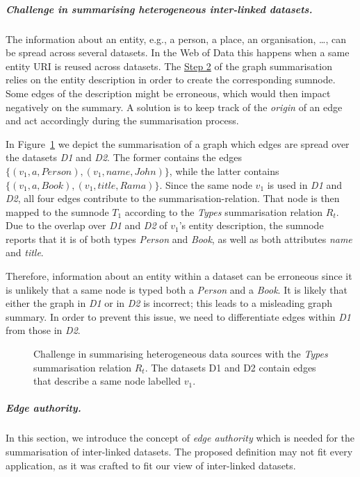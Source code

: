 \subparagraph{Challenge in summarising heterogeneous inter-linked datasets.}

The information about an entity, e.g., a person, a place, an organisation, \ldots, can be spread across several datasets. In the Web of Data this happens when a same entity URI is reused across datasets. The \hyperref[step-hn]{Step 2} of the graph summarisation relies on the entity description  in order to create the corresponding sumnode. Some edges of the description might be erroneous, which would then impact negatively on the summary. A solution is to keep track of the \emph{origin} of an edge and act accordingly during the summarisation process.

In Figure~\ref{chap4:summary:fig:sum-issue} we depict the summarisation of a graph which edges are spread over the datasets \emph{D1} and \emph{D2}. The former contains the edges $\{ (v_1, a, Person), (v_1, name, John) \}$, while the latter contains $\{ (v_1, a, Book), (v_1, title, Rama) \}$. Since the same node $v_1$ is used in \emph{D1} and \emph{D2}, all four edges contribute to the \gls{summarisation-relation}. That node is then mapped to the sumnode $T_1$ according to the \emph{Types} summarisation relation $R_t$.
Due to the overlap over \emph{D1} and \emph{D2} of $v_1$'s entity description, the sumnode reports that it is of both types \emph{Person} and \emph{Book}, as well as both \gls{attributes} \emph{name} and \emph{title}.

Therefore, information about an entity within a dataset can be erroneous since it is unlikely that a same node is typed both a \emph{Person} and a \emph{Book}. It is likely that either the graph in \emph{D1} or in \emph{D2} is incorrect; this leads to a misleading graph summary.
In order to prevent this issue, we need to differentiate edges within \emph{D1} from those in \emph{D2}.

\begin{figure}
	\centering
	\resizebox{.8\textwidth}{!}{
		
	}
	\caption[Challenge in summarising heterogeneous data sources with the \emph{Types} summarisation relation $R_t$]{Challenge in summarising heterogeneous data sources with the \emph{Types} summarisation relation $R_t$. The datasets D1 and D2 contain edges that describe a same node labelled $v_1$.}
	\label{chap4:summary:fig:sum-issue}
\end{figure}

\subparagraph{Edge authority.}

In this section, we introduce the concept of \emph{edge authority} which is needed for the summarisation of inter-linked datasets. The proposed definition may not fit every application, as it was crafted to fit our view of inter-linked datasets.

